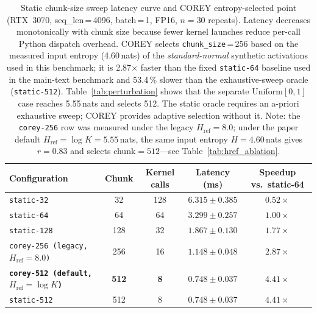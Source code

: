 \begin{table}[!t]
\centering
\caption{Static chunk-size sweep latency curve and COREY entropy-selected point (RTX~3070, seq\_len\,=\,4096, batch\,=\,1, FP16, $n{=}30$ repeats). Latency decreases monotonically with chunk size because fewer kernel launches reduce per-call Python dispatch overhead. COREY selects \texttt{chunk\_size}\,=\,256 based on the measured input entropy (4.60\,nats) of the \emph{standard-normal} synthetic activations used in this benchmark; it is 2.87$\times$ faster than the fixed \texttt{static-64} baseline used in the main-text benchmark and 53.4\,\% slower than the exhaustive-sweep oracle (\texttt{static-512}). Table~\ref{tab:perturbation} shows that the separate Uniform$[0,1]$ case reaches 5.55\,nats and selects 512. The static oracle requires an a-priori exhaustive sweep; COREY provides adaptive selection without it. Note: the \texttt{corey-256} row was measured under the legacy $H_{\text{ref}}{=}8.0$; under the paper default $H_{\text{ref}}{=}\log K{=}5.55$\,nats, the same input entropy $H{=}4.60$\,nats gives $r{=}0.83$ and selects chunk$=512$---see Table~\ref{tab:href_ablation}.}
\label{tab:chunk_sweep}
\small
\begin{tabular}{lcccc}
\toprule
Configuration & Chunk & Kernel calls & Latency (ms) & Speedup vs.\ static-64 \\
\midrule
\texttt{static-32}   & 32  & 128 & $6.315 \pm 0.385$ & $0.52\times$ \\
\texttt{static-64}   & 64  &  64 & $3.299 \pm 0.257$ & $1.00\times$ \\
\texttt{static-128}  & 128 &  32 & $1.867 \pm 0.130$ & $1.77\times$ \\
\texttt{corey-256 (legacy, $H_{\text{ref}}{=}8.0$)} & 256 & 16 & $1.148 \pm 0.048$ & $2.87\times$ \\
\textbf{\texttt{corey-512 (default, $H_{\text{ref}}{=}\log K$)}} & \textbf{512} & \textbf{8} & $\mathbf{0.748 \pm 0.037}$ & $\mathbf{4.41\times}$ \\
\texttt{static-512}  & 512 &   8 & $0.748 \pm 0.037$ & $4.41\times$ \\
\bottomrule
\end{tabular}
\end{table}

